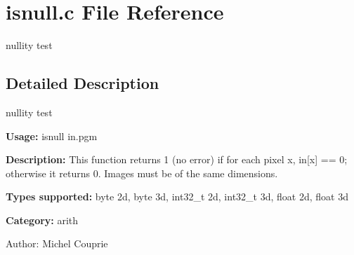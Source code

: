 \section{isnull.c File Reference}
\label{isnull_8c}
nullity test 



\subsection{Detailed Description}
nullity test 

{\bf Usage:} isnull in.pgm

{\bf Description:} This function returns 1 (no error) if for each pixel x, in[x] == 0; otherwise it returns 0. Images must be of the same dimensions.

{\bf Types supported:} byte 2d, byte 3d, int32\_\-t 2d, int32\_\-t 3d, float 2d, float 3d

{\bf Category:} arith

\begin{Desc}
\item[Author:]Michel Couprie \end{Desc}

